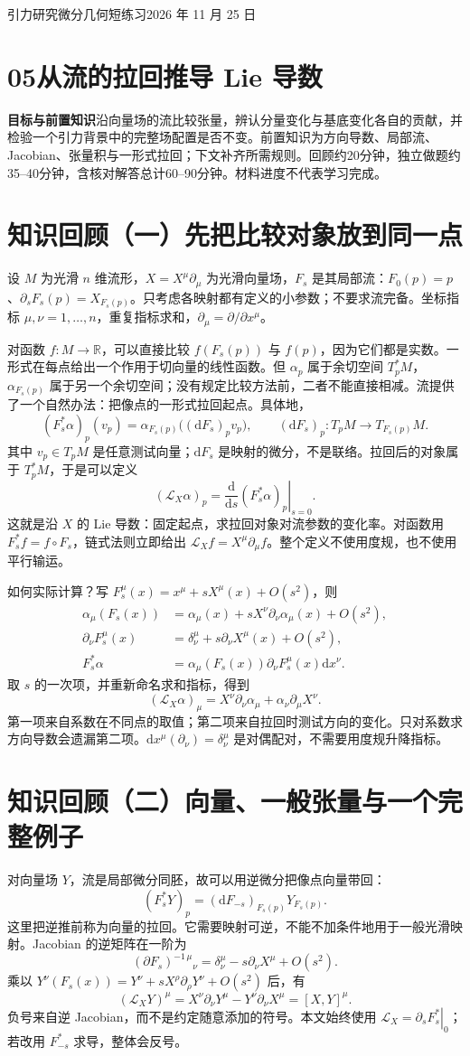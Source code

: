 \documentclass[11pt,a4paper]{article}
\newcommand{\D}{\mathrm d}\newcommand{\Lie}{\mathcal L}
\newcommand{\head}[1]{\section*{\color{teal}#1}}
\begin{document}
{\large 引力研究微分几何短练习\hfill 2026 年 11 月 25 日}
\head{05\quad 从流的拉回推导 Lie 导数}
\textbf{目标与前置知识}\quad 沿向量场的流比较张量，辨认分量变化与基底变化各自的贡献，并检验一个引力背景中的完整场配置是否不变。前置知识为方向导数、局部流、Jacobian、张量积与一形式拉回；下文补齐所需规则。回顾约20分钟，独立做题约35--40分钟，含核对解答总计60--90分钟。材料进度不代表学习完成。
\head{知识回顾（一）\quad 先把比较对象放到同一点}
设 $M$ 为光滑 $n$ 维流形，$X=X^\mu\partial_\mu$ 为光滑向量场，$F_s$ 是其局部流：$F_0(p)=p$、$\partial_sF_s(p)=X_{F_s(p)}$。只考虑各映射都有定义的小参数；不要求流完备。坐标指标 $\mu,\nu=1,\ldots,n$，重复指标求和，$\partial_\mu=\partial/\partial x^\mu$。

对函数 $f:M\to\mathbb R$，可以直接比较 $f(F_s(p))$ 与 $f(p)$，因为它们都是实数。一形式在每点给出一个作用于切向量的线性函数。但 $\alpha_p$ 属于余切空间 $T_p^*M$，$\alpha_{F_s(p)}$ 属于另一个余切空间；没有规定比较方法前，二者不能直接相减。流提供了一个自然办法：把像点的一形式拉回起点。具体地，
\[
 (F_s^*\alpha)_p(v_p)=\alpha_{F_s(p)}\bigl((\D F_s)_p v_p\bigr),
 \qquad (\D F_s)_p:T_pM\longrightarrow T_{F_s(p)}M.
\]
其中 $v_p\in T_pM$ 是任意测试向量；$\D F_s$ 是映射的微分，不是联络。拉回后的对象属于 $T_p^*M$，于是可以定义
\[
 (\Lie_X\alpha)_p=\left.\frac{\D}{\D s}(F_s^*\alpha)_p\right|_{s=0}.
\]
这就是沿 $X$ 的 Lie 导数：固定起点，求拉回对象对流参数的变化率。对函数用 $F_s^*f=f\circ F_s$，链式法则立即给出 $\Lie_Xf=X^\mu\partial_\mu f$。整个定义不使用度规，也不使用平行输运。

如何实际计算？写 $F_s^\mu(x)=x^\mu+sX^\mu(x)+O(s^2)$，则
\begin{align*}
 \alpha_\mu(F_s(x))&=\alpha_\mu(x)+sX^\nu\partial_\nu\alpha_\mu(x)+O(s^2),\\
 \partial_\nu F_s^\mu(x)&=\delta^\mu_\nu+s\partial_\nu X^\mu(x)+O(s^2),\\
 F_s^*\alpha&=\alpha_\mu(F_s(x))\partial_\nu F_s^\mu(x)\D x^\nu.
\end{align*}
取 $s$ 的一次项，并重新命名求和指标，得到
\[
 (\Lie_X\alpha)_\mu=X^\nu\partial_\nu\alpha_\mu+\alpha_\nu\partial_\mu X^\nu.
\]
第一项来自系数在不同点的取值；第二项来自拉回时测试方向的变化。只对系数求方向导数会遗漏第二项。$\D x^\mu(\partial_\nu)=\delta^\mu_\nu$ 是对偶配对，不需要用度规升降指标。
\newpage
\head{知识回顾（二）\quad 向量、一般张量与一个完整例子}
对向量场 $Y$，流是局部微分同胚，故可以用逆微分把像点向量带回：
\[
 (F_s^*Y)_p=(\D F_{-s})_{F_s(p)}Y_{F_s(p)}.
\]
这里把逆推前称为向量的拉回。它需要映射可逆，不能不加条件地用于一般光滑映射。Jacobian 的逆矩阵在一阶为
\[
 (\partial F_s)^{-1\,\mu}{}_{\nu}
 =\delta^\mu_\nu-s\partial_\nu X^\mu+O(s^2).
\]
乘以 $Y^\nu(F_s(x))=Y^\nu+sX^\rho\partial_\rho Y^\nu+O(s^2)$ 后，有
\[
 (\Lie_XY)^\mu=X^\nu\partial_\nu Y^\mu-Y^\nu\partial_\nu X^\mu=[X,Y]^\mu.
\]
负号来自逆 Jacobian，而不是约定随意添加的符号。本文始终使用 $\Lie_X=\left.\partial_s F_s^*\right|_0$；若改用 $F_{-s}^*$ 求导，整体会反号。
\end{document}
